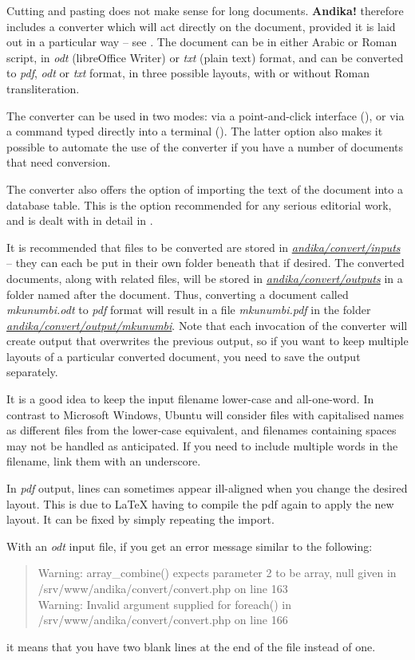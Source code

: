 Cutting and pasting does not make sense for long documents.  \textbf{Andika!} therefore includes a converter which will act directly on the document, provided it is laid out in a particular way -- see .  The document can be in either Arabic or Roman script, in \textit{odt} (libreOffice Writer) or \textit{txt} (plain text) format, and can be converted to \textit{pdf}, \textit{odt} or \textit{txt} format, in three possible layouts, with or without Roman transliteration.

The converter can be used in two modes: via a point-and-click interface (), or via a command typed directly into a terminal ().  The latter option also makes it possible to automate the use of the converter if you have a number of documents that need conversion.

The converter also offers the option of importing the text of the document into a database table.  This is the option recommended for any serious editorial work, and is dealt with in detail in .

It is recommended that files to be converted are stored in \textit{\url{andika/convert/inputs}} -- they can each be put in their own folder beneath that if desired.  The converted documents, along with related files, will be stored in \textit{\url{andika/convert/outputs}} in a folder named after the document.  Thus, converting a document called \textit{mkunumbi.odt} to \textit{pdf} format will result in a file \textit{mkunumbi.pdf} in the folder \textit{\url{andika/convert/output/mkunumbi}}.  Note that each invocation of the converter will create output that overwrites the previous output, so if you want to keep multiple layouts of a particular converted document, you need to save the output separately.

It is a good idea to keep the input filename lower-case and all-one-word.  In contrast to Microsoft Windows, Ubuntu will consider files with capitalised names as different files from the lower-case equivalent, and filenames containing spaces may not be handled as anticipated.  If you need to include multiple words in the filename, link them with an underscore.

In \textit{pdf} output, lines can sometimes appear ill-aligned when you change the desired layout.  This is due to LaTeX having to compile the pdf again to apply the new layout.  It can be fixed by simply repeating the import.  

With an \textit{odt} input file, if you get an error message similar to the following:
\begin{quotation}
Warning: array_combine() expects parameter 2 to be array, null given in /srv/www/andika/convert/convert.php on line 163\\
Warning: Invalid argument supplied for foreach() in /srv/www/andika/convert/convert.php on line 166
\end{quotation}
it means that you have two blank lines at the end of the file instead of one.

